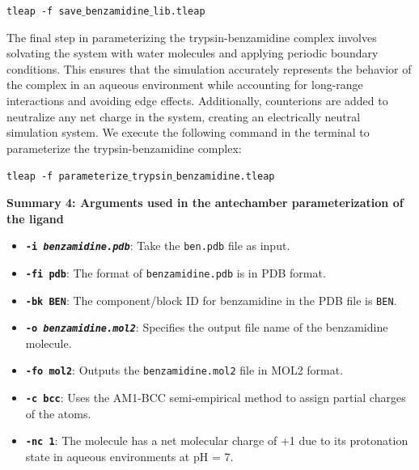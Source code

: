 \documentclass[9pt,training,pubversion]{livecoms}
\begin{document}
\begin{tcolorbox}[colback=black!8!white, colframe=black!50!black, fontlower=\tiny, left=2pt, right=2pt, top=2pt, bottom=2pt] 
\texttt{tleap -f save$\_$benzamidine$\_$lib.tleap}
\end{tcolorbox}

\noindent The final step in parameterizing the trypsin-benzamidine complex involves solvating the system with water molecules and applying periodic boundary conditions. This ensures that the simulation accurately represents the behavior of the complex in an aqueous environment while accounting for long-range interactions and avoiding edge effects. Additionally, counterions are added to neutralize any net charge in the system, creating an electrically neutral simulation system. We execute the following command in the terminal to parameterize the trypsin-benzamidine complex:

\begin{tcolorbox}[colback=black!8!white, colframe=black!50!black, fontlower=\tiny, left=2pt, right=2pt, top=2pt, bottom=2pt] 
\texttt{tleap -f parameterize$\_$trypsin$\_$benzamidine.tleap}
\end{tcolorbox}

\begin{tcolorbox}[colback=black!8!white, colframe=black!50!black, fontlower=\tiny, left=0pt, right=10pt, top=2pt, bottom=2pt]
\textbf{Summary 4: Arguments used in the antechamber parameterization of the ligand}
\begin{itemize}
\item \texttt{\textbf{-i \textit{benzamidine.pdb}}}: Take the \texttt{ben.pdb} file as input.
\item \texttt{\textbf{-fi pdb}}: The format of \texttt{benzamidine.pdb} is in PDB format.
\item \texttt{\textbf{-bk BEN}}: The component/block ID for benzamidine in the PDB file is \texttt{BEN}.
\item \texttt{\textbf{-o \textit{benzamidine.mol2}}}: Specifies the output file name of the benzamidine molecule.
\item \texttt{\textbf{-fo mol2}}: Outputs the \texttt{benzamidine.mol2} file in MOL2 format.
\item \texttt{\textbf{-c bcc}}: Uses the AM1-BCC semi-empirical method to assign partial charges of the atoms.
\item \texttt{\textbf{-nc 1}}: The molecule has a net molecular charge of +1 due to its protonation state in aqueous environments at pH = 7.
\end{itemize}
\end{tcolorbox}
\end{document}
